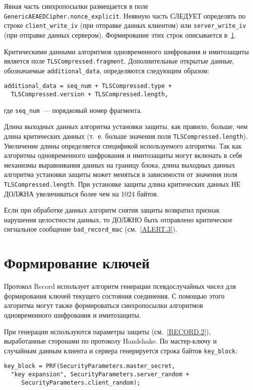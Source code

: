Явная часть синхропосылки размещается в поле 
\lstinline{GenericAEAEDCipher.nonce_explicit}. Неявную часть СЛЕДУЕТ 
определять по строке \lstinline{client_write_iv} (при отправке данных 
клиентом) или \lstinline{server_write_iv} (при отправке данных сервером). 
Формирование этих строк описывается в~\ref{RECORD.4}.  

Критическими данными алгоритмов одновременного шифрования и имитозащиты 
является поле \lstinline{TLSCompressed.fragment}. Дополнительные открытые 
данные, обозначаемые \lstinline{additional_data}, определяются следующим 
образом:
\begin{lstlisting}
additional_data = seq_num + TLSCompressed.type + 
  TLSCompressed.version + TLSCompressed.length,
\end{lstlisting}
где \lstinline{seq_num}~--- порядковый номер фрагмента.

Длина выходных данных алгоритма установки защиты, как правило, больше, чем 
длина критических данных (т.~е. больше значения поля 
\lstinline{TLSCompressed.length}). Увеличение длины определяется спецификой 
используемого алгоритма. Так как алгоритмы одновременного шифрования и 
имитозащиты могут включать в себя механизмы выравнивания данных на 
границу блока, длина выходных данных алгоритма установки защиты может 
меняться в зависимости от значения поля \lstinline{TLSCompressed.length}. 
При установке защиты длина критических данных НЕ ДОЛЖНА увеличиваться 
более чем на 1024 байтов. 


Если при обработке данных алгоритм снятия защиты возвратил признак 
нарушения целостности данных, то ДОЛЖНО быть отправлено критическое 
сигнальное сообщение \lstinline{bad_record_mac} (см.~\ref{ALERT.3}). 

\section{Формирование ключей}\label{RECORD.4}

Протокол Record использует алгоритм генерации псевдослучайных чисел для 
формирования ключей текущего состояния соединения. С помощью этого 
алгоритма могут также формироваться синхропосылки алгоритмов 
одновременного шифрования и имитозащиты. 

При генерации используются параметры защиты (см.~\ref{RECORD.2}), выработанные 
сторонами по протоколу Handshake. По мастер-ключу и случайным данным 
клиента и сервера генерируется строка байтов \lstinline{key_block}: 
\begin{lstlisting}
key_block = PRF(SecurityParameters.master_secret, 
  "key expansion", SecurityParameters.server_random + 
     SecurityParameters.client_random);
\end{lstlisting}

